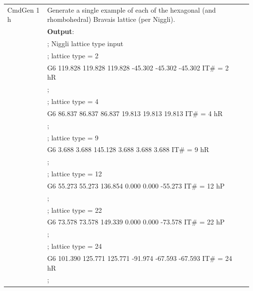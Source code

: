 \documentclass[preprint]{iucr}              %
\numberwithin{equation}{section}
\begin{document}
\begin{table}
\begin{tabular}{l l l l}
			CmdGen 1 h& Generate a single example of each of the hexagonal (and rhombohedral) Bravais lattice (per Niggli).\\
			{}&\textbf{Output}:\\
			{}&; Niggli lattice type input\\
			{}&; lattice type = 2\\
			{}&G6   119.828   119.828   119.828   -45.302   -45.302   -45.302   IT\# = 2  hR\\
			{}&;\\
			{}&; lattice type = 4\\
			{}&G6    86.837    86.837    86.837    19.813    19.813    19.813   IT\# = 4  hR\\
			{}&;\\
			{}&; lattice type = 9\\
			{}&G6     3.688     3.688   145.128     3.688     3.688     3.688   IT\# = 9  hR\\
			{}&;\\
			{}&; lattice type = 12\\
			{}&G6    55.273    55.273   136.854     0.000     0.000   -55.273   IT\# = 12  hP\\
			{}&;\\
			{}&; lattice type = 22\\
			{}&G6    73.578    73.578   149.339     0.000     0.000   -73.578   IT\# = 22  hP\\
			{}&;\\
			{}&; lattice type = 24\\
			{}&G6   101.390   125.771   125.771   -91.974   -67.593   -67.593   IT\# = 24  hR\\
			{}&;\\
			\bottomrule
		\end{tabular}	
	\end{table}	
	
	
\end{document}
